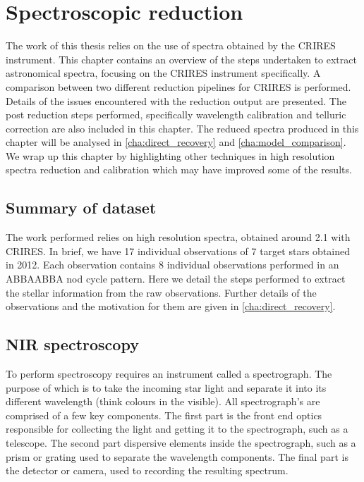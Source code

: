 
\chapter{Spectroscopic reduction} %
\label{cha:reduction}
The work of this thesis relies on the use of \nir{} spectra obtained by the {CRIRES} instrument. This chapter contains an overview of the steps undertaken to extract astronomical spectra, focusing on the {CRIRES} instrument specifically. A comparison between two different reduction pipelines for {CRIRES} is performed. Details of the issues encountered with the reduction output are presented. The post reduction steps performed, specifically wavelength calibration and telluric correction are also included in this chapter. The reduced spectra produced in this chapter will be analysed in \cref{cha:direct_recovery} and \cref{cha:model_comparison}. We wrap up this chapter by highlighting other techniques in high resolution \nir{} spectra reduction and calibration which may have improved some of the results.

\section{Summary of dataset}
\todo{}{}
The work performed relies on high resolution \nir{} spectra, obtained around 2.1\um{} with {CRIRES}. In brief, we have 17 individual observations of 7 target stars obtained in 2012. Each observation contains 8 individual observations performed in an {ABBAABBA} nod cycle pattern. Here we detail the steps performed to extract the stellar information from the raw observations. Further details of the observations and the motivation for them are given in \cref{cha:direct_recovery}.


\section{NIR spectroscopy}
To perform spectroscopy requires an instrument called a spectrograph. The purpose of which is to take the incoming star light and separate it into its different wavelength (think colours in the visible). All spectrograph's are comprised of a few key components. The first part is the front end optics responsible for collecting the light and getting it to the spectrograph, such as a telescope. The second part dispersive elements inside the spectrograph, such as a prism or grating used to separate the wavelength components. The final part is the detector or camera, used to recording the resulting spectrum.

